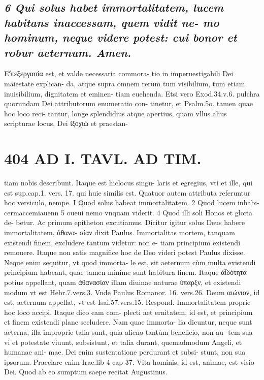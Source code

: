 \documentclass{article}
\begin{document}
\begin{pages}
\subsection*{\textit{6 Qui solus habet immortalitatem, lucem habitans inaccessam, quem vidit ne- mo hominum, neque videre potest: cui bonor et robur aeternum. Amen. }}\pstart Εʹ̓πεξεργασία est, et valde necessaria commora- tio in imperuestigabili Dei maiestate explican- da, atque supra omnem rerum tum visibilium, tum etiam inuisibilium, dignitatem et eminen- tiam euehenda. Etsi vero Exod.34.v.6. pulchra quorundam Dei attributorum enumeratio con- tinetur, et Psalm.5o. tamen quae hoc loco reci- tantur, longe splendidius atque apertius, quam vllus alius scripturae locus, Dei ἰξοχιὼ et praestan-  \pend
\section*{404 AD I. TAVL. AD TIM. }\pstart tiam nobis describunt. Itaque est hiclocus singu- laris et egregius, vti et ille, qui est sup.cap.1. vers. 17. qui huie similis est. Quatuor autem attributa referuntur hoc versiculo, nempe. I Quod solus habeat immortalitatem. 2 Quod lucem inhabi- cermaccemiauenn 5 oueui nemo vnquam viderit. 4 Quod illi soli Honos et gloria de- betur.  \pend\pstart Ac primum epitheton excutiamus. Dicitur igitur solus Deus habere immortalitatem, ἀθανα- σίαν dixit Paulus. Immortalitas mortem, tanquam existendi finem, excludere tantum videtur: non e- tiam principium existendi remouere. Itaque non satis magnifice hoc de Deo videri potest Paulus dixisse. Neque enim sequitur, vt quod immorta- le est, sit aeternum cùm multa existendi principium habeant, quae tamen minime sunt habitura finem. Itaque ἀἶδότητα potius appellant, quam ἀθανασίαν illam diuinae naturae ὐπαρξν, et existendi modum vt est Hebr.7.vers.3. Vnde Paulus Romanor. 16. vers.26. Deum αιώνιον, id est, aeternum appellat, vt est Isai.57.vers.15. Respond. Immortalitatem proprie hoc loco accipi. Itaque dico eam com- plecti aet ernitatem, id est, et principium et finem existendi plane secludere. Nam quae immorta- lia dicuntur, neque sunt aeterna, illa improprie talia sunt, quia alieno tantùm beneficio, non au- tem sua vi et potestate viuunt, subsistunt, et talia durant, quemadmodum Angeli, et humanae ani- mae. Dei enim sustentatione perdurant et subsi- stunt, non sua ipsorum. Praeclare enim Irae.lib 4 cap 37. Vita hominis, id est, animae, est visio Dei. Quod ab eo sumptum saepe recitat Augustinus.  \pend

\end{pages}
\end{document}
